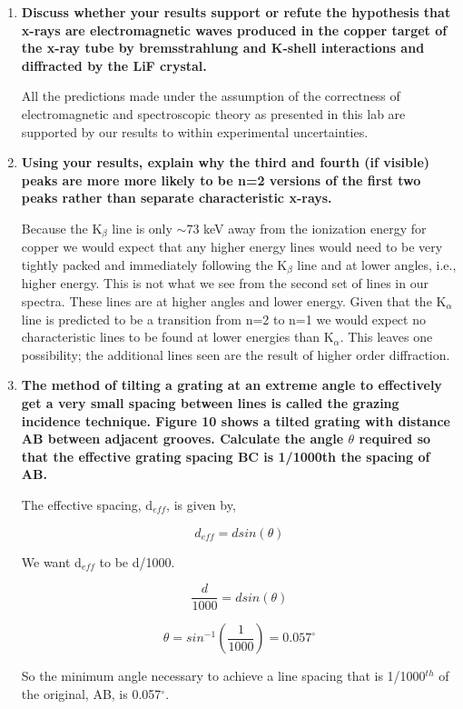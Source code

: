 \documentclass[justified]{tufte-book}
\begin{document}
\begin{enumerate}[resume]
\item {\bf Discuss whether your results support or refute the hypothesis that x-rays are electromagnetic waves produced in the copper target of the x-ray tube by bremsstrahlung and K-shell interactions and diffracted by the LiF crystal.}\newline

All the predictions made under the assumption of the correctness of electromagnetic and spectroscopic theory as presented in this lab are supported by our results to within experimental uncertainties.

\item {\bf Using your results, explain why the third and fourth (if visible) peaks are more more likely to be n=2 versions of the first two peaks rather than separate characteristic x-rays.}\newline

Because the K$_{\beta}$ line is only $\sim$73 keV away from the ionization energy for copper we would expect that any higher energy lines would need to be very tightly packed and immediately following the K$_{\beta}$ line and at lower angles, i.e., higher energy. This is not what we see from the second set of lines in our spectra. These lines are at higher angles and lower energy. Given that the K$_{\alpha}$ line is predicted to be a transition from n=2 to n=1 we would expect no characteristic lines to be found at lower energies than K$_{\alpha}$. This leaves one possibility; the additional lines seen are the result of higher order diffraction.

\item {\bf The method of tilting a grating at an extreme angle to effectively get a very small spacing between lines is called the {\bf grazing incidence technique}. Figure 10 shows a tilted grating with distance AB between adjacent grooves. Calculate the angle $\theta$ required so that the effective grating spacing BC is 1/1000th the spacing of AB.}\newline

The effective spacing, d$_{eff}$, is given by,

\begin{equation}
d_{eff}=dsin(\theta)
\label{equ:twcg5}
\end{equation}

\noindent We want d$_{eff}$ to be d/1000.

\begin{equation}
\dfrac{d}{1000}=dsin(\theta)
\label{equ:twcg6}
\end{equation}

\begin{equation}
\theta=sin^{-1}\left(\dfrac{1}{1000}\right)=0.057^{\circ}
\label{equ:twcg7}
\end{equation}

So the minimum angle necessary to achieve a line spacing that is 1/1000$^{th}$ of the original, AB, is 0.057$^{\circ}$.

\end{enumerate}
\newpage
\end{document}
